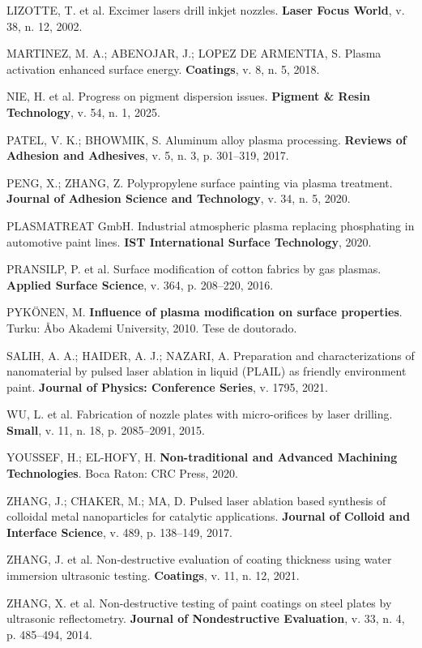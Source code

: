 \documentclass[
  12pt,
  a4paper,
  oneside,
  brazil,
  chapter=TITLE
]{article}
\begin{document}
LIZOTTE, T. et al. Excimer lasers drill inkjet nozzles. \textbf{Laser Focus World}, v. 38, n. 12, 2002.

MARTINEZ, M. A.; ABENOJAR, J.; LOPEZ DE ARMENTIA, S. Plasma activation enhanced surface energy. \textbf{Coatings}, v. 8, n. 5, 2018.

NIE, H. et al. Progress on pigment dispersion issues. \textbf{Pigment \& Resin Technology}, v. 54, n. 1, 2025.

PATEL, V. K.; BHOWMIK, S. Aluminum alloy plasma processing. \textbf{Reviews of Adhesion and Adhesives}, v. 5, n. 3, p. 301--319, 2017.

PENG, X.; ZHANG, Z. Polypropylene surface painting via plasma treatment. \textbf{Journal of Adhesion Science and Technology}, v. 34, n. 5, 2020.

PLASMATREAT GmbH. Industrial atmospheric plasma replacing phosphating in automotive paint lines. \textbf{IST International Surface Technology}, 2020.

PRANSILP, P. et al. Surface modification of cotton fabrics by gas plasmas. \textbf{Applied Surface Science}, v. 364, p. 208--220, 2016.

PYKÖNEN, M. \textbf{Influence of plasma modification on surface properties}. Turku: Åbo Akademi University, 2010. Tese de doutorado.

SALIH, A. A.; HAIDER, A. J.; NAZARI, A. Preparation and characterizations of nanomaterial by pulsed laser ablation in liquid (PLAIL) as friendly environment paint. \textbf{Journal of Physics: Conference Series}, v. 1795, 2021.

WU, L. et al. Fabrication of nozzle plates with micro-orifices by laser drilling. \textbf{Small}, v. 11, n. 18, p. 2085--2091, 2015.

YOUSSEF, H.; EL-HOFY, H. \textbf{Non-traditional and Advanced Machining Technologies}. Boca Raton: CRC Press, 2020.

ZHANG, J.; CHAKER, M.; MA, D. Pulsed laser ablation based synthesis of colloidal metal nanoparticles for catalytic applications. \textbf{Journal of Colloid and Interface Science}, v. 489, p. 138--149, 2017.

ZHANG, J. et al. Non-destructive evaluation of coating thickness using water immersion ultrasonic testing. \textbf{Coatings}, v. 11, n. 12, 2021.

ZHANG, X. et al. Non-destructive testing of paint coatings on steel plates by ultrasonic reflectometry. \textbf{Journal of Nondestructive Evaluation}, v. 33, n. 4, p. 485--494, 2014.
\end{document}
